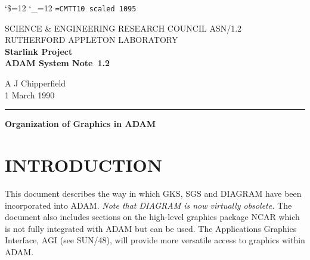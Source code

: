 \pagestyle{myheadings}

\newcommand{\stardoccategory}  {ADAM System Note}
\newcommand{\stardocinitials}  {ASN}
\newcommand{\stardocnumber}    {1.2}
\newcommand{\stardocauthors}   {A J Chipperfield}
\newcommand{\stardocdate}      {1 March 1990}
\newcommand{\stardoctitle}     {Organization of Graphics in ADAM}

\newcommand{\stardocname}{\stardocinitials /\stardocnumber}
\markright{\stardocname}
\setlength{\textwidth}{160mm}
\setlength{\textheight}{240mm}
\setlength{\topmargin}{-5mm}
\setlength{\oddsidemargin}{0mm}
\setlength{\evensidemargin}{0mm}
\setlength{\parindent}{0mm}
\setlength{\parskip}{\medskipamount}
\setlength{\unitlength}{1mm}

\catcode`\$=12 \catcode`\_=12
\font\tt=CMTT10 scaled 1095
\renewcommand{\_}{{\tt\char'137}}


\thispagestyle{empty}
SCIENCE \& ENGINEERING RESEARCH COUNCIL \hfill \stardocname\\
RUTHERFORD APPLETON LABORATORY\\
{\large\bf Starlink Project\\}
{\large\bf \stardoccategory\ \stardocnumber}
\begin{flushright}
\stardocauthors\\
\stardocdate
\end{flushright}
\vspace{-4mm}
\rule{\textwidth}{0.5mm}
\vspace{5mm}
\begin{center}
{\Large\bf \stardoctitle}
\end{center}
\vspace{5mm}

\section{INTRODUCTION}
This document describes the way in which GKS, SGS and DIAGRAM have
been incorporated into ADAM. 
{\em Note that DIAGRAM is now virtually obsolete.}
The document also includes sections on
the high-level graphics package NCAR which is not fully integrated
with ADAM but can be used.
The Applications Graphics Interface, AGI (see SUN/48), will provide
more versatile access to graphics within ADAM.


